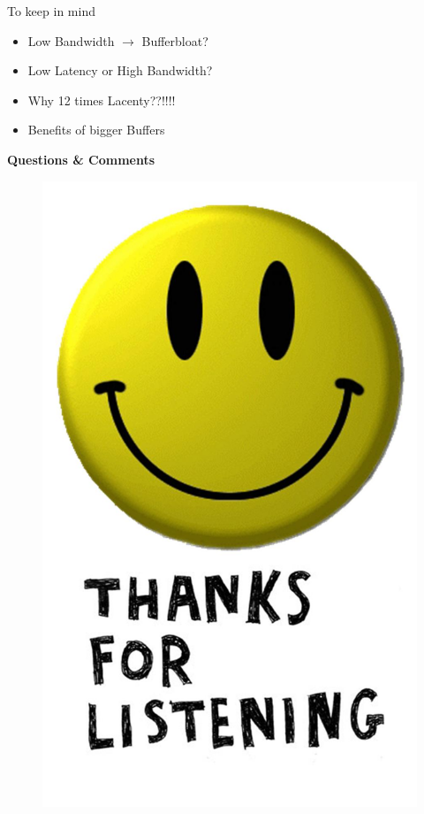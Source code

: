 \begin{frame}
	\begin{block}{To keep in mind}
	\begin{itemize}
		\item Low Bandwidth $\rightarrow$ Bufferbloat?
		\item Low Latency or High Bandwidth?
		\item Why 12 times Lacenty??!!!!
		\item Benefits of bigger Buffers
	\end{itemize}
\end{block}
\end{frame}

\begin{frame}
	\begin{block}{}
		\centering
		\textbf{Questions \& Comments}
	\end{block}
\end{frame}

\begin{frame}
	\begin{figure}[h!]
		\centering
		\includegraphics[scale=.5]{img/listen}
	\end{figure}
\end{frame}
